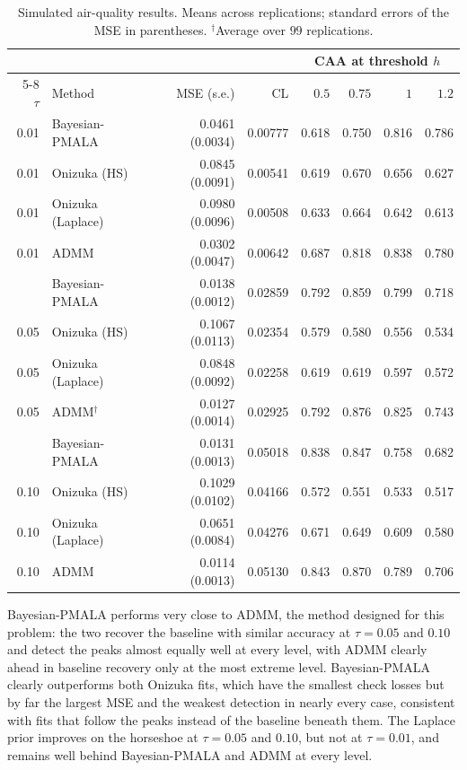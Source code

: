 \begin{table}[H]
\centering
\small
\setlength{\tabcolsep}{4pt}
\caption{Simulated air-quality results. Means across replications; standard errors of the MSE in parentheses. $^{\dagger}$Average over $99$ replications.}
\label{tab:air_n500}
\begin{tabular}{@{}rlrrrrrr@{}}
\toprule
 & & & & \multicolumn{4}{c}{CAA at threshold $h$} \\
\cmidrule(lr){5-8}
$\tau$ & Method & MSE (s.e.) & CL & $0.5$ & $0.75$ & $1$ & $1.2$ \\
\midrule
0.01 & Bayesian-PMALA & 0.0461 (0.0034) & 0.00777 & 0.618 & 0.750 & 0.816 & 0.786 \\
0.01 & Onizuka (HS) & 0.0845 (0.0091) & 0.00541 & 0.619 & 0.670 & 0.656 & 0.627 \\
0.01 & Onizuka (Laplace) & 0.0980 (0.0096) & 0.00508 & 0.633 & 0.664 & 0.642 & 0.613 \\
0.01 & ADMM & 0.0302 (0.0047) & 0.00642 & 0.687 & 0.818 & 0.838 & 0.780 \\
\addlinespace[3pt]
0.05 & Bayesian-PMALA & 0.0138 (0.0012) & 0.02859 & 0.792 & 0.859 & 0.799 & 0.718 \\
0.05 & Onizuka (HS) & 0.1067 (0.0113) & 0.02354 & 0.579 & 0.580 & 0.556 & 0.534 \\
0.05 & Onizuka (Laplace) & 0.0848 (0.0092) & 0.02258 & 0.619 & 0.619 & 0.597 & 0.572 \\
0.05 & ADMM$^{\dagger}$ & 0.0127 (0.0014) & 0.02925 & 0.792 & 0.876 & 0.825 & 0.743 \\
\addlinespace[3pt]
0.10 & Bayesian-PMALA & 0.0131 (0.0013) & 0.05018 & 0.838 & 0.847 & 0.758 & 0.682 \\
0.10 & Onizuka (HS) & 0.1029 (0.0102) & 0.04166 & 0.572 & 0.551 & 0.533 & 0.517 \\
0.10 & Onizuka (Laplace) & 0.0651 (0.0084) & 0.04276 & 0.671 & 0.649 & 0.609 & 0.580 \\
0.10 & ADMM & 0.0114 (0.0013) & 0.05130 & 0.843 & 0.870 & 0.789 & 0.706 \\
\bottomrule
\end{tabular}
\end{table}

Bayesian-PMALA performs very close to ADMM, the method designed for this problem: the two recover the baseline with similar accuracy at $\tau=0.05$ and $0.10$ and detect the peaks almost equally well at every level, with ADMM clearly ahead in baseline recovery only at the most extreme level. Bayesian-PMALA clearly outperforms both Onizuka fits, which have the smallest check losses but by far the largest MSE and the weakest detection in nearly every case, consistent with fits that follow the peaks instead of the baseline beneath them. The Laplace prior improves on the horseshoe at $\tau=0.05$ and $0.10$, but not at $\tau=0.01$, and remains well behind Bayesian-PMALA and ADMM at every level.
